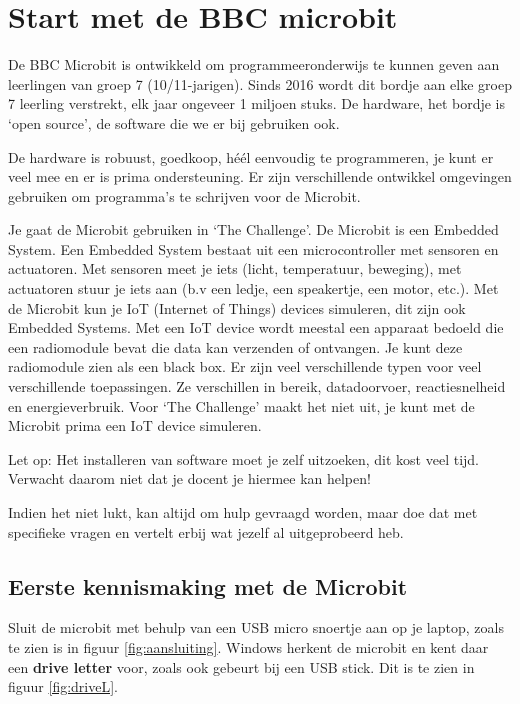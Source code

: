 
\section{Start met de BBC microbit}

De BBC Microbit is ontwikkeld om programmeeronderwijs te kunnen geven aan leerlingen van groep 7 (10/11-jarigen). Sinds 2016 wordt dit bordje aan elke groep 7 leerling verstrekt, elk jaar ongeveer 1 miljoen stuks. De hardware, het bordje is ‘open source’, de software die we er bij gebruiken ook.

De hardware is robuust, goedkoop, héél eenvoudig te programmeren, je kunt er veel mee en er is prima ondersteuning. Er zijn verschillende ontwikkel omgevingen gebruiken om programma’s te schrijven voor de Microbit. 

Je gaat de Microbit gebruiken in ‘The Challenge’. De Microbit is een Embedded System. Een Embedded System bestaat uit een microcontroller met sensoren en actuatoren. Met sensoren meet je iets (licht, temperatuur, beweging), met actuatoren stuur je iets aan (b.v een ledje, een speakertje, een motor, etc.). Met de Microbit kun je IoT (Internet of Things) devices simuleren, dit zijn ook Embedded Systems. Met een IoT device wordt meestal een apparaat bedoeld die een radiomodule bevat die data kan verzenden of ontvangen. Je kunt deze radiomodule zien als een black box. Er zijn veel verschillende typen voor veel verschillende toepassingen. Ze verschillen in bereik, datadoorvoer, reactiesnelheid en energieverbruik. 
Voor ‘The Challenge’ maakt het niet uit, je kunt met de Microbit prima een IoT device simuleren.

Let op: Het installeren van software moet je zelf uitzoeken, dit kost veel tijd. Verwacht daarom niet dat je docent je hiermee kan helpen!

Indien het niet lukt, kan altijd om hulp gevraagd worden, maar doe dat met specifieke vragen en vertelt erbij wat jezelf al uitgeprobeerd heb.


\subsection{Eerste kennismaking met de Microbit}

Sluit de microbit met behulp van een USB micro snoertje aan op je laptop, zoals te zien is in figuur \ref{fig:aansluiting}.
Windows herkent de microbit en kent daar een \textbf{drive letter} voor, zoals ook gebeurt bij een USB stick. Dit is te zien in figuur \ref{fig:driveL}.

